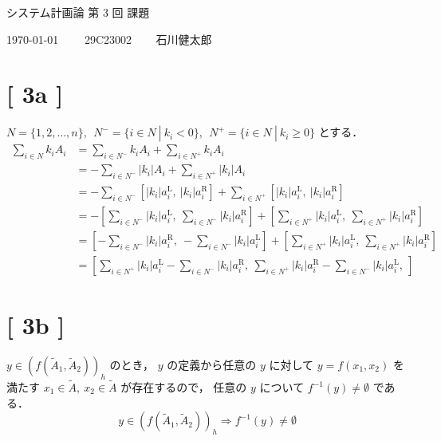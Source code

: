 \documentclass[uplatex, a4j, 10pt, fleqn, dvipdfmx]{article}
\begin{document}
\begin{center}
	{\Huge システム計画論 第 3 回 課題}
\end{center}

\begin{flushright}
	{\Large \today ~~~~ 29C23002 ~~~ 石川健太郎}
\end{flushright}

\section*{[ 3a ]}

\noindent
$N = \{ 1, 2, \dots, n \}, ~~ N^- = \{ i \in N ~ | ~ k_i < 0 \}, ~~ N^+ = \{ i \in N ~ | ~ k_i \geq 0 \}$ とする．
\begin{align}
	\sum_{i \in N} k_i A_i
	 & = \sum_{i \in N^-} k_i A_i + \sum_{i \in N^+} k_i A_i
	\\
	 & = - \sum_{i \in N^-} \left| k_i \right| A_i + \sum_{i \in N^+} \left| k_i \right| A_i
	\\
	 & = - \sum_{i \in N^-} \left[ \left| k_i \right| a_i^\text{L}, ~ \left| k_i \right| a_i^\text{R} \right] +
	\sum_{i \in N^+} \left[ \left| k_i \right| a_i^\text{L}, ~ \left| k_i \right| a_i^\text{R} \right]
	\\
	 & = - \left[
		\sum_{i \in N^-} \left| k_i \right| a_i^\text{L}, ~ \sum_{i \in N^-} \left| k_i \right| a_i^\text{R}
		\right] + \left[
		\sum_{i \in N^+} \left| k_i \right| a_i^\text{L}, ~ \sum_{i \in N^+} \left| k_i \right| a_i^\text{R}
		\right]
	\\
	 & = \left[
		- \sum_{i \in N^-} \left| k_i \right| a_i^\text{R}, ~ - \sum_{i \in N^-} \left| k_i \right| a_i^\text{L}
		\right] + \left[
		\sum_{i \in N^+} \left| k_i \right| a_i^\text{L}, ~ \sum_{i \in N^+} \left| k_i \right| a_i^\text{R}
		\right]
	\\
	 & = \left[
		\sum_{i \in N^+} \left| k_i \right| a_i^\text{L} - \sum_{i \in N^-} \left| k_i \right| a_i^\text{R}, ~
		\sum_{i \in N^+} \left| k_i \right| a_i^\text{R} - \sum_{i \in N^-} \left| k_i \right| a_i^\text{L}, ~
		\right]
\end{align}

\section*{[ 3b ]}

\noindent
$y \in \left( f \left( \tilde{A}_1, \tilde{A}_2 \right) \right)_h$ のとき，
$y$ の定義から任意の $y$ に対して $y = f \left( x_1, x_2 \right)$ を満たす
$x_1 \in \tilde{A}, ~ x_2 \in \tilde{A}$ が存在するので，
任意の $y$ について $f^{-1}(y) \neq \emptyset$ である．
\begin{equation}
	y \in \left( f \left( \tilde{A}_1, \tilde{A}_2 \right) \right)_h
	\Rightarrow
	f^{-1}(y) \neq \emptyset
	\label{fom2-1}
\end{equation}
\end{document}
